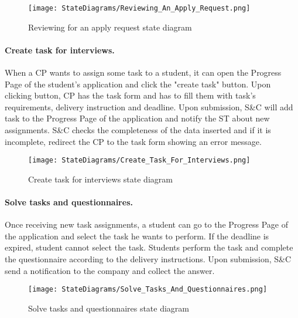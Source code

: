 \begin{figure}[H]
    \begin{center}
        \texttt{[image: StateDiagrams/Reviewing\_An\_Apply\_Request.png]}
        \caption{Reviewing for an apply request state diagram}
        \label{fig:reviewing_an_apply_request_sd}%
    \end{center}
\end{figure}

\paragraph{Create task for interviews.}
When a CP wants to assign some task to a student, it can open the Progress Page of the student's application and click the "create task" button.
Upon clicking button, CP has the task form and has to fill them with task's requirements, delivery instruction and deadline.
Upon submission, S\&C will add task to the Progress Page of the application and notify the ST about new assignments.
S\&C checks the completeness of the data inserted and if it is incomplete, redirect the CP to the task form showing an error message.

\begin{figure}[H]
    \begin{center}
        \texttt{[image: StateDiagrams/Create\_Task\_For\_Interviews.png]}
        \caption{Create task for interviews state diagram}
        \label{fig:create_task_for_interviews_sd}%
    \end{center}
\end{figure}

\paragraph{Solve tasks and questionnaires.}
Once receiving new task assignments, a student can go to the Progress Page of the application and select the task he wants to perform. If the deadline is expired, student cannot select the task.
Students perform the task and complete the questionnaire according to the delivery instructions.
Upon submission, S\&C send a notification to the company and collect the answer.

\begin{figure}[H]
    \begin{center}
        \texttt{[image: StateDiagrams/Solve\_Tasks\_And\_Questionnaires.png]}
        \caption{Solve tasks and questionnaires state diagram}
        \label{fig:solve_tasks_and_questionnaires_sd}%
    \end{center}
\end{figure}

